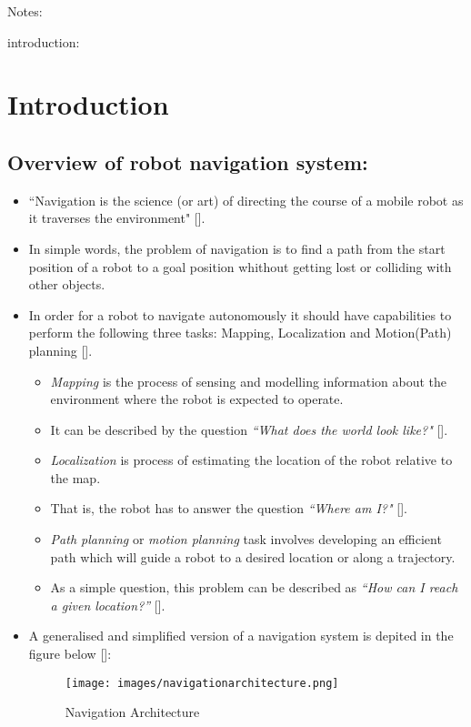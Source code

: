 Notes:

introduction:



\section{Introduction} 
\subsection{Overview of robot navigation system:}
\begin{itemize}
 \item ``{Navigation} is the science (or art) of directing the course of a mobile robot as it traverses the environment"  [].
 \item In simple words, the problem of navigation is to find a path from the start position of a robot to a goal position whithout getting lost or colliding with other objects.
 \item In order for a robot to navigate autonomously it should have capabilities to perform the following three tasks: Mapping, Localization
and Motion(Path) planning [].
  \begin{itemize}
    \item \textit{Mapping} is the process of sensing and modelling information about the environment where the robot is expected to operate. 
    \item It can be described by the question \textit{``What does the world look like?"} [].\\
    \item \textit{Localization} is process of estimating the location of the robot relative to the map. 
    \item That is, the robot has to answer the question \textit{``Where am I?"} [].\\
    \item \textit{Path planning} or \textit{motion planning} task involves developing an efficient path which will guide a robot to a desired location or along a trajectory. 
    \item As a simple question, this problem can be described as \textit{``How can I reach a given location?”} [].
  \end{itemize}
  \item A generalised and simplified version of a navigation system is depited in the figure below []:
\begin{figure}[htbp] %
   \centering
   \texttt{[image: images/navigationarchitecture.png]} 
   \caption{Navigation Architecture}
   \label{Figure: Robot navigation System. The three tasks the robot must accomplish (highlighted in cyan) are in between a high-level layer and a low-level layer.}
\end{figure}



\end{itemize}
